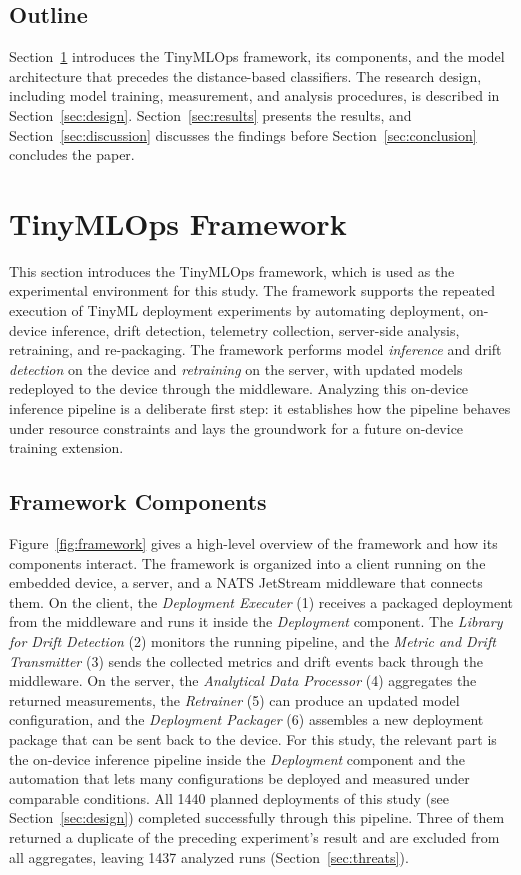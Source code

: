 \documentclass[sigconf,review,nonacm]{acmart}
\begin{document}
\subsection{Outline}
Section~\ref{sec:framework} introduces the TinyMLOps framework, its components, and the model architecture that precedes the distance-based classifiers.
The research design, including model training, measurement, and analysis procedures, is described in Section~\ref{sec:design}.
Section~\ref{sec:results} presents the results, and Section~\ref{sec:discussion} discusses the findings before Section~\ref{sec:conclusion} concludes the paper.

\section{TinyMLOps Framework}
\label{sec:framework}
This section introduces the TinyMLOps framework, which is used as the experimental environment for this study.
The framework supports the repeated execution of TinyML deployment experiments by automating deployment, on-device inference, drift detection, telemetry collection, server-side analysis, retraining, and re-packaging.
The framework performs model \emph{inference} and drift \emph{detection} on the device and \emph{retraining} on the server, with updated models redeployed to the device through the middleware.
Analyzing this on-device inference pipeline is a deliberate first step: it establishes how the pipeline behaves under resource constraints and lays the groundwork for a future on-device training extension.

\subsection{Framework Components}
Figure~\ref{fig:framework} gives a high-level overview of the framework and how its components interact.
The framework is organized into a client running on the embedded device, a server, and a NATS JetStream middleware that connects them.
On the client, the \emph{Deployment Executer} (1) receives a packaged deployment from the middleware and runs it inside the \emph{Deployment} component.
The \emph{Library for Drift Detection} (2) monitors the running pipeline, and the \emph{Metric and Drift Transmitter} (3) sends the collected metrics and drift events back through the middleware.
On the server, the \emph{Analytical Data Processor} (4) aggregates the returned measurements, the \emph{Retrainer} (5) can produce an updated model configuration, and the \emph{Deployment Packager} (6) assembles a new deployment package that can be sent back to the device.
For this study, the relevant part is the on-device inference pipeline inside the \emph{Deployment} component and the automation that lets many configurations be deployed and measured under comparable conditions.
All 1440 planned deployments of this study (see Section~\ref{sec:design}) completed successfully through this pipeline. Three of them returned a duplicate of the preceding experiment's result and are excluded from all aggregates, leaving 1437 analyzed runs (Section~\ref{sec:threats}).
\end{document}
